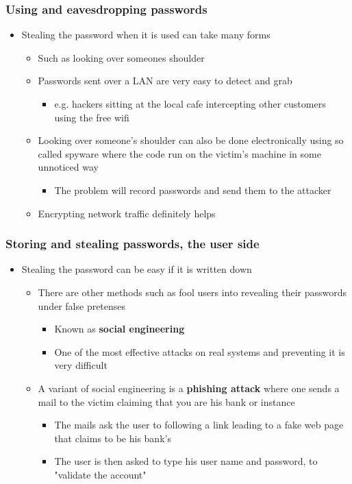 \documentclass[11pt]{article}
\begin{document}
\subsubsection{Using and eavesdropping passwords}
\label{sec:orgbd30e5d}
\begin{itemize}
\item Stealing the password when it is used can take many forms
\begin{itemize}
\item Such as looking over someones shoulder
\item Passwords sent over a LAN are very easy to detect and grab
\begin{itemize}
\item e.g. hackers sitting at the local cafe intercepting other customers using the free wifi
\end{itemize}
\item Looking over someone's shoulder can also be done electronically using so called spyware where the code run on the victim's machine in some unnoticed way
\begin{itemize}
\item The problem will record passwords and send them to the attacker
\end{itemize}
\item Encrypting network traffic definitely helps
\end{itemize}
\end{itemize}

\subsubsection{Storing and stealing passwords, the user side}
\label{sec:orgcfc6cb5}
\begin{itemize}
\item Stealing the password can be easy if it is written down 
\begin{itemize}
\item There are other methods such as fool users into revealing their passwords under false pretenses
\begin{itemize}
\item Known as \textbf{social engineering}
\item One of the most effective attacks on real systems and preventing it is very difficult
\end{itemize}
\item A variant of social engineering is a \textbf{phishing attack} where one sends a mail to the victim claiming that you are his bank or instance
\begin{itemize}
\item The mails ask the user to following a link leading to a fake web page that claims to be his bank's
\item The user is then asked to type his user name and password, to "validate the account"
\end{itemize}
\end{itemize}
\end{itemize}
\end{document}
